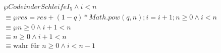 \documentclass{bschlangaul-aufgabe}
\begin{document}
\begin{liAntwort}
\begin{align*}
&\wp{Code in der Schleife}{I_5 \land i < n}\\
& \equiv \wp{res = res + (1-q) * Math.pow(q, n); i = i + 1;}{n \geq 0 \land i < n} \\
& \equiv \wp{}{n \geq 0 \land i + 1 < n} \\
& \equiv n \geq 0 \land i + 1 < n \\
& \equiv \text{wahr für }n \geq 0 \land i < n - 1 \\
\end{align*}
\end{liAntwort}
\end{document}
